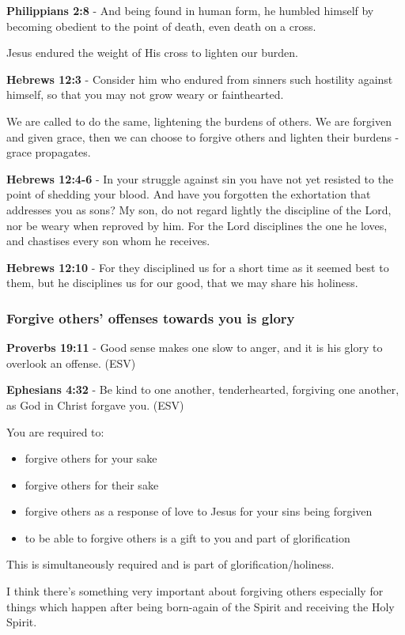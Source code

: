 \documentclass[11pt]{article}
\begin{document}
\textbf{Philippians 2:8} - And being found in human form, he humbled himself by becoming obedient to the point of death, even death on a cross.

Jesus endured the weight of His cross to lighten our burden.

\textbf{Hebrews 12:3} - Consider him who endured from sinners such hostility against himself, so that you may not grow weary or fainthearted.

We are called to do the same, lightening the burdens of others.
We are forgiven and given grace, then we can choose to forgive others and lighten their burdens - grace propagates.

\textbf{Hebrews 12:4-6} - In your struggle against sin you have not yet resisted to the point of shedding your blood. And have you forgotten the exhortation that addresses you as sons? My son, do not regard lightly the discipline of the Lord, nor be weary when reproved by him. For the Lord disciplines the one he loves, and chastises every son whom he receives.

\textbf{Hebrews 12:10} - For they disciplined us for a short time as it seemed best to them, but he disciplines us for our good, that we may share his holiness.

\subsubsection{Forgive others' offenses towards you is glory}
\label{sec:org34cb582}
\textbf{Proverbs 19:11} - Good sense makes one slow to anger, and it is his glory to overlook an offense. (ESV)

\textbf{Ephesians 4:32} - Be kind to one another, tenderhearted, forgiving one another, as God in Christ forgave you. (ESV)

You are required to:
\begin{itemize}
\item forgive others for your sake
\item forgive others for their sake
\item forgive others as a response of love to Jesus for your sins being forgiven
\item to be able to forgive others is a gift to you and part of glorification
\end{itemize}

This is simultaneously required and is part of glorification/holiness.

I think there's something very important about forgiving others especially for things which happen after being born-again of the Spirit and receiving the Holy Spirit.
\end{document}
